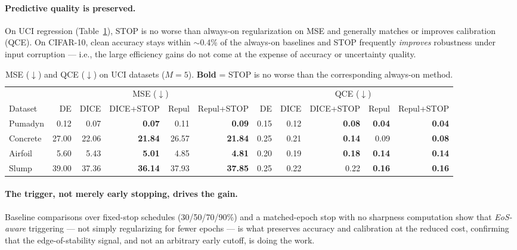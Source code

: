 \documentclass[11pt]{article}
\begin{document}
\paragraph{Predictive quality is preserved.}
On UCI regression (Table~\ref{tab:uci}), STOP is no worse than always-on regularization on MSE
and generally matches or improves calibration (QCE). On CIFAR-10, clean accuracy stays within
$\sim$0.4\% of the always-on baselines and STOP frequently \emph{improves} robustness under
input corruption --- i.e., the large efficiency gains do not come at the expense of accuracy or
uncertainty quality.

\begin{table}[ht]
\centering
\caption{MSE ($\downarrow$) and QCE ($\downarrow$) on UCI datasets ($M=5$). \textbf{Bold} = STOP
is no worse than the corresponding always-on method.}
\label{tab:uci}
\small
\setlength{\tabcolsep}{4pt}
\begin{tabular}{l rrrrr rrrrr}
\toprule
& \multicolumn{5}{c}{MSE ($\downarrow$)} & \multicolumn{5}{c}{QCE ($\downarrow$)} \\
\cmidrule(lr){2-6} \cmidrule(lr){7-11}
Dataset & DE & DICE & DICE+STOP & Repul & Repul+STOP & DE & DICE & DICE+STOP & Repul & Repul+STOP \\
\midrule
Pumadyn  & 0.12  & 0.07  & \textbf{0.07}  & 0.11  & \textbf{0.09}  & 0.15 & 0.12 & \textbf{0.08} & \textbf{0.04} & \textbf{0.04} \\
Concrete & 27.00 & 22.06 & \textbf{21.84} & 26.57 & \textbf{21.84} & 0.25 & 0.21 & \textbf{0.14} & 0.09 & \textbf{0.08} \\
Airfoil  & 5.60  & 5.43  & \textbf{5.01}  & 4.85  & \textbf{4.81}  & 0.20 & 0.19 & \textbf{0.18} & \textbf{0.14} & \textbf{0.14} \\
Slump    & 39.00 & 37.36 & \textbf{36.14} & 37.93 & \textbf{37.85} & 0.25 & 0.22 & 0.22 & \textbf{0.16} & \textbf{0.16} \\
\bottomrule
\end{tabular}
\end{table}

\paragraph{The trigger, not merely early stopping, drives the gain.}
Baseline comparisons over fixed-stop schedules (30/50/70/90\%) and a matched-epoch stop with no
sharpness computation show that \emph{EoS-aware} triggering --- not simply regularizing for fewer
epochs --- is what preserves accuracy and calibration at the reduced cost, confirming that the
edge-of-stability signal, and not an arbitrary early cutoff, is doing the work.
\end{document}
